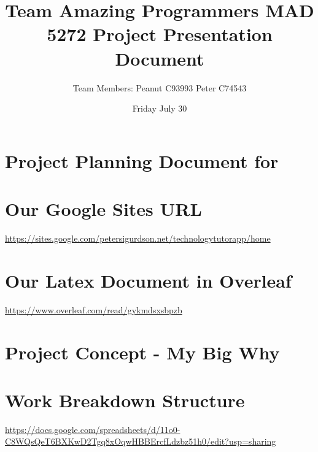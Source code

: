 \documentclass[16pt]{article}
\title{Team Amazing Programmers MAD 5272 Project Presentation Document}
\author{Team Members: Peanut C93993   Peter C74543    }
\date{Friday July 30  }
\begin{document}
\maketitle
\section{Project Planning Document for}




\section{Our Google Sites URL}
\url{https://sites.google.com/petersigurdson.net/technologytutorapp/home}

\section{Our Latex Document in Overleaf}
\url{https://www.overleaf.com/read/gykmdsxsbpzb}

\section{Project Concept - My Big Why}






%

\section{Work Breakdown Structure}
\url{https://docs.google.com/spreadsheets/d/11o0-C8WQsQeT6BXKwD2Tgq8xOqwHBBErcfLdzbz51h0/edit?usp=sharing}
\end{document}
